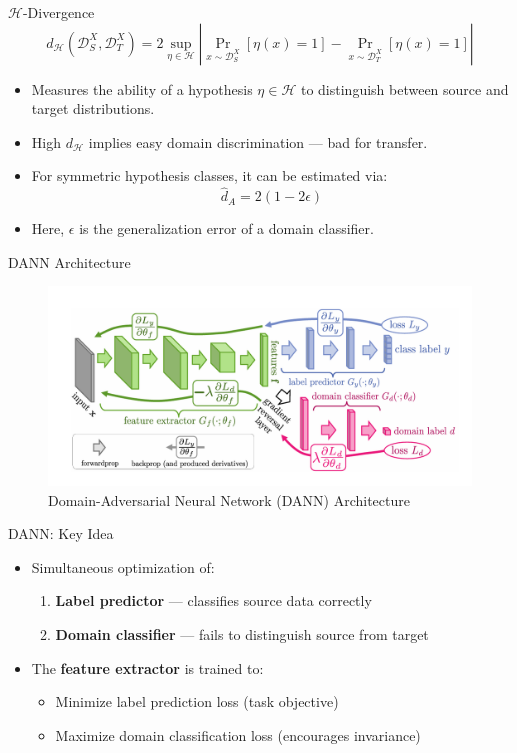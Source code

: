 \documentclass{beamer}
\begin{document}
\begin{frame}{$\mathcal{H}$-Divergence}
\[
d_{\mathcal{H}}(\mathcal{D}_S^X, \mathcal{D}_T^X) = 2 \sup_{\eta \in \mathcal{H}} \left| \Pr_{x \sim \mathcal{D}_S^X}[\eta(x)=1] - \Pr_{x \sim \mathcal{D}_T^X}[\eta(x)=1] \right|
\]

\begin{itemize}
    \item Measures the ability of a hypothesis $\eta \in \mathcal{H}$ to distinguish between source and target distributions.
    \item High $d_{\mathcal{H}}$ implies easy domain discrimination — bad for transfer.
    \item For symmetric hypothesis classes, it can be estimated via:
    \[
    \hat{d}_A = 2 (1 - 2\epsilon)
    \]
    \item Here, $\epsilon$ is the generalization error of a domain classifier.
\end{itemize}
\end{frame}

\begin{frame}{DANN Architecture}
\begin{figure}
    \centering
    \includegraphics[width=0.9\linewidth]{DANN_img.png}
    \caption{Domain-Adversarial Neural Network (DANN) Architecture}
\end{figure}
\end{frame}



\begin{frame}{DANN: Key Idea}
\begin{itemize}
    \item Simultaneous optimization of:
    \begin{enumerate}
        \item \textbf{Label predictor} — classifies source data correctly
        \item \textbf{Domain classifier} — fails to distinguish source from target
    \end{enumerate}
    \item The \textbf{feature extractor} is trained to:
    \begin{itemize}
        \item Minimize label prediction loss (task objective)
        \item Maximize domain classification loss (encourages invariance)
    \end{itemize}
\end{itemize}
\end{frame}
\end{document}
